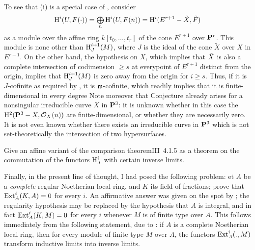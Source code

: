 To see that (i) is a special case of , consider
$$
\H^i(U, F(\cdot))=\sisi{\coprod}{\tbigoplus}_n \H^i (U, F(n))= \H^i(E^{r+1} -\sisi{X}{\tilde X}, \tilde{F})$$
as a module over the affine ring $k[t_0, \ldots, t_r]$ of the cone $E^{r+1}$ over $\PP^r$. This module is none other than $\H_J^{i+1}(M)$, where $J$ is the ideal of the cone $\tilde X$ over $X$ in $E^{r+1}$. On the other hand, the hypothesis on $X$, which implies that $\sisi{X}{\tilde X}$ is also a complete intersection of co\sisi{-}{}dimension $\ge s$ at every\pageoriginale point of $E^{r+1}$ distinct from the origin, implies that $\H^{i+1}_J(M)$ is zero away from the origin for $i\ge s$. Thus, if it is $J$-cofinite as required by , it is \afortiori $\mm$-cofinite, which readily implies that it is finite-dimensional in every degree Note moreover that Conjecture  already arises for a nonsingular irreducible curve $X$ in $\PP^3$: it is unknown whether in this case the $\H^2(\PP^3-X, \OX(n))$ are finite-dimensional, or whether they are necessarily zero. It is not even known whether there exists an irreducible curve in $\PP^3$ which is not set-theoretically the intersection of two hypersurfaces\label{courbesurface}.

\begin{probleme} \label{XIII.1.4}
Give an affine variant of the \og comparison theorem\fg \textup{\EGA III~4.1.5} as a theorem on the commutation of the functors $\H^i_J$ with certain inverse limits.
\end{probleme}

Finally, in the present line of thought, I had posed the following problem: et $A$ be a \emph{complete} regular Noetherian local ring, and $K$ its field of fractions; prove that $\Ext^i_A(K, A)=0$ for every $i$. An affirmative answer was given on the spot by ; the regularity hypothesis may be replaced by the hypothesis that $A$ is integral, and in fact $\Ext^i_A(K, M)=0$ for every $i$ whenever $M$ is of finite type over $A$. This follows immediately from the following statement, due to : if $A$ is a complete Noetherian local ring, then for every module of finite type $M$ over $A$, the functors $\Ext_A^i(., M)$ transform inductive limits into inverse limits.

